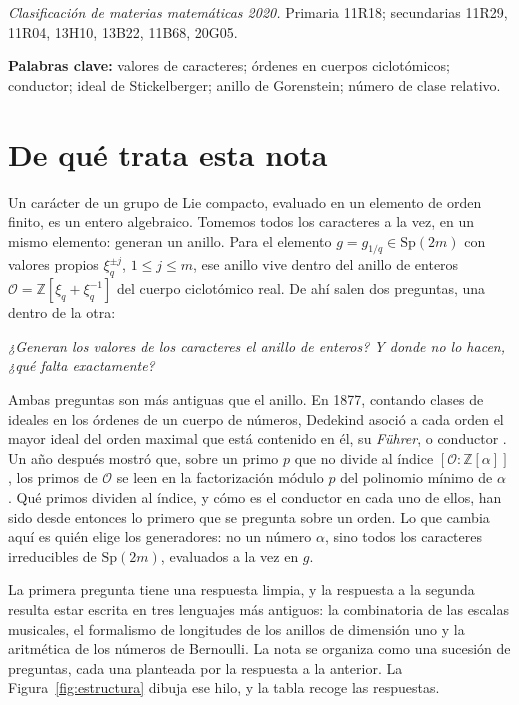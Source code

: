 \documentclass[11pt,a4paper]{article}
\theoremstyle{definition}
\newcommand{\Sp}{\mathrm{Sp}}
\newcommand{\ZZ}{\mathbb{Z}}
\newcommand{\cO}{\mathcal{O}}
\newcommand{\pregunta}[1]{\par\smallskip\noindent\emph{#1}\par\smallskip}
\begin{document}
\medskip
\begin{center}\small
\emph{Clasificación de materias matemáticas 2020.}\;
Primaria 11R18; secundarias 11R29, 11R04, 13H10, 13B22, 11B68, 20G05.
\end{center}

\noindent\textbf{Palabras clave:} valores de caracteres; órdenes en cuerpos ciclotómicos; conductor; ideal de
Stickelberger; anillo de Gorenstein; número de clase relativo.

\section{De qué trata esta nota}\label{sec:intro}

Un carácter de un grupo de Lie compacto, evaluado en un elemento de orden finito, es un entero algebraico.
Tomemos todos los caracteres a la vez, en un mismo elemento: generan un anillo. Para el elemento
$g=g_{1/q}\in\Sp(2m)$ con valores propios $\xi_q^{\pm j}$, $1\le j\le m$, ese anillo vive dentro del anillo de
enteros $\cO=\ZZ[\xi_q+\xi_q^{-1}]$ del cuerpo ciclotómico real. De ahí salen dos preguntas, una dentro de la
otra:

\pregunta{¿Generan los valores de los caracteres el anillo de enteros? Y donde no lo hacen, ¿qué falta
exactamente?}

\noindent Ambas preguntas son más antiguas que el anillo. En 1877, contando clases de ideales en los órdenes de un
cuerpo de números, Dedekind asoció a cada orden el mayor ideal del orden maximal que está contenido en él, su
\emph{Führer}, o conductor \cite{Ded77}. Un año después mostró que, sobre un primo $p$ que no divide al índice
$[\cO:\ZZ[\alpha]]$, los primos de $\cO$ se leen en la factorización módulo $p$ del polinomio mínimo de $\alpha$
\cite{Ded78}. Qué primos dividen al índice, y cómo es el conductor en cada uno de ellos, han sido desde entonces lo
primero que se pregunta sobre un orden. Lo que cambia aquí es quién elige los generadores: no un número $\alpha$,
sino todos los caracteres irreducibles de $\Sp(2m)$, evaluados a la vez en $g$.

\noindent La primera pregunta tiene una respuesta limpia, y la respuesta a la segunda resulta estar escrita en
tres lenguajes más antiguos: la combinatoria de las escalas musicales, el formalismo de longitudes de los anillos
de dimensión uno y la aritmética de los números de Bernoulli. La nota se organiza como una sucesión de preguntas,
cada una planteada por la respuesta a la anterior. La Figura~\ref{fig:estructura} dibuja ese hilo, y la tabla
recoge las respuestas.
\end{document}
